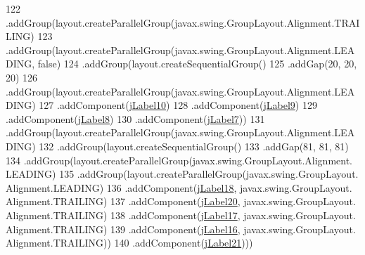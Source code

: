 \begin{DoxyCode}
122                 .addGroup(layout.createParallelGroup(javax.swing.GroupLayout.Alignment.TRAILING)
123                     .addGroup(layout.createParallelGroup(javax.swing.GroupLayout.Alignment.LEADING, \textcolor{keyword}{false})
124                         .addGroup(layout.createSequentialGroup()
125                             .addGap(20, 20, 20)
126                             .addGroup(layout.createParallelGroup(javax.swing.GroupLayout.Alignment.LEADING)
127                                 .addComponent(\mbox{\hyperlink{class_interfaz_package_1_1_interfaz_consulta_factura_a0461634349aa909bfae6f71cde48237e}{jLabel10}})
128                                 .addComponent(\mbox{\hyperlink{class_interfaz_package_1_1_interfaz_consulta_factura_a1d3ecb3e98c0cd65e46d2c18f1aa1aef}{jLabel9}})
129                                 .addComponent(\mbox{\hyperlink{class_interfaz_package_1_1_interfaz_consulta_factura_af48914b9b888e1bf5f30c0ffc0886c8f}{jLabel8}})
130                                 .addComponent(\mbox{\hyperlink{class_interfaz_package_1_1_interfaz_consulta_factura_a590afc655fceef038e603a5471cf720e}{jLabel7}}))
131                             .addGroup(layout.createParallelGroup(javax.swing.GroupLayout.Alignment.LEADING)
132                                 .addGroup(layout.createSequentialGroup()
133                                     .addGap(81, 81, 81)
134                                     .addGroup(layout.createParallelGroup(javax.swing.GroupLayout.Alignment.
      LEADING)
135                                         .addGroup(layout.createParallelGroup(javax.swing.GroupLayout.
      Alignment.LEADING)
136                                             .addComponent(\mbox{\hyperlink{class_interfaz_package_1_1_interfaz_consulta_factura_a352b4e6a3aa39375f57c78e2740b4cd9}{jLabel18}}, javax.swing.GroupLayout.
      Alignment.TRAILING)
137                                             .addComponent(\mbox{\hyperlink{class_interfaz_package_1_1_interfaz_consulta_factura_a66d5645db5c2843eaf50cd96457bb4b4}{jLabel20}}, javax.swing.GroupLayout.
      Alignment.TRAILING)
138                                             .addComponent(\mbox{\hyperlink{class_interfaz_package_1_1_interfaz_consulta_factura_a041b6262d6b6883bcbc9ffed38bcdcdd}{jLabel17}}, javax.swing.GroupLayout.
      Alignment.TRAILING)
139                                             .addComponent(\mbox{\hyperlink{class_interfaz_package_1_1_interfaz_consulta_factura_a587aaa1d1e0e2ca30b4d2200fd1728e4}{jLabel16}}, javax.swing.GroupLayout.
      Alignment.TRAILING))
140                                         .addComponent(\mbox{\hyperlink{class_interfaz_package_1_1_interfaz_consulta_factura_af22e036163f2449a57e02b294812cfc7}{jLabel21}})))

\end{DoxyCode}
